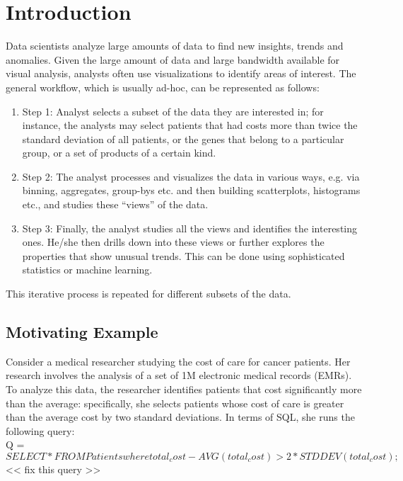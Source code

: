\section{Introduction}
\label{sec:intro}
Data scientists analyze large amounts of data to find new insights, trends and
anomalies. Given the large amount of data and large bandwidth available for
visual analysis, analysts often use visualizations to identify areas of
interest. The general workflow, which is usually ad-hoc, can be represented as
follows:

\begin{enumerate}
  \item Step 1: Analyst selects a subset of the data they are interested in; for
  instance, the analysts may select patients that had costs more than twice the
  standard deviation of all patients, or the genes that belong to a particular
  group, or a set of products of a certain kind.
  \item Step 2: The analyst processes and visualizes the data in various ways,
  e.g. via binning, aggregates, group-bys etc. and then building scatterplots,
  histograms etc., and studies these ``views'' of the data.
  \item Step 3: Finally, the analyst studies all the views and identifies the
  interesting ones. He/she then drills down into these views or further explores
  the properties that show unusual trends. This can be done using sophisticated
  statistics or machine learning.
\end{enumerate}
This iterative process is repeated for different subsets of the data. 

\subsection{Motivating Example}
\label{motivation_example}

Consider a medical researcher studying the cost of care for cancer patients. Her
research involves the analysis of a set of 1M electronic medical records (EMRs).
To analyze this data, the researcher identifies patients that cost
significantly more than the average: specifically, she selects patients whose
cost of care is greater than the average cost by two standard deviations. In
terms of SQL, she runs the following query: \\

\noindent Q = $SELECT * FROM Patients where total_cost - AVG(total_cost) >
2 * STDDEV (total_cost);$
<< fix this query >>

